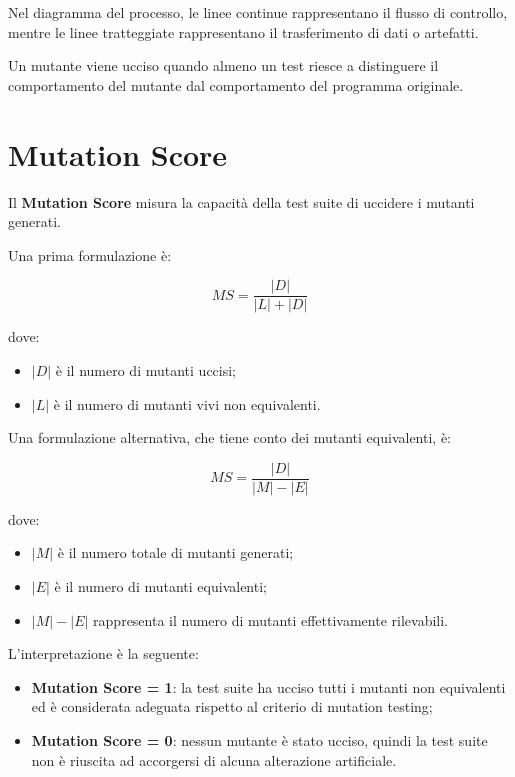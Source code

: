 \begin{notaslide}
Nel diagramma del processo, le linee continue rappresentano il flusso di controllo, mentre le linee tratteggiate rappresentano il trasferimento di dati o artefatti.
\end{notaslide}

\begin{notaesame}
Un mutante viene ucciso quando almeno un test riesce a distinguere il comportamento del mutante dal comportamento del programma originale.
\end{notaesame}

\section{Mutation Score}

Il \textbf{Mutation Score} misura la capacità della test suite di uccidere i mutanti generati.

Una prima formulazione è:

\[
MS = \frac{|D|}{|L| + |D|}
\]

dove:

\begin{itemize}
    \item \(|D|\) è il numero di mutanti uccisi;
    \item \(|L|\) è il numero di mutanti vivi non equivalenti.
\end{itemize}

Una formulazione alternativa, che tiene conto dei mutanti equivalenti, è:

\[
MS = \frac{|D|}{|M| - |E|}
\]

dove:

\begin{itemize}
    \item \(|M|\) è il numero totale di mutanti generati;
    \item \(|E|\) è il numero di mutanti equivalenti;
    \item \(|M| - |E|\) rappresenta il numero di mutanti effettivamente rilevabili.
\end{itemize}

L'interpretazione è la seguente:

\begin{itemize}
    \item \textbf{Mutation Score = 1}: la test suite ha ucciso tutti i mutanti non equivalenti ed è considerata adeguata rispetto al criterio di mutation testing;
    \item \textbf{Mutation Score = 0}: nessun mutante è stato ucciso, quindi la test suite non è riuscita ad accorgersi di alcuna alterazione artificiale.
\end{itemize}

